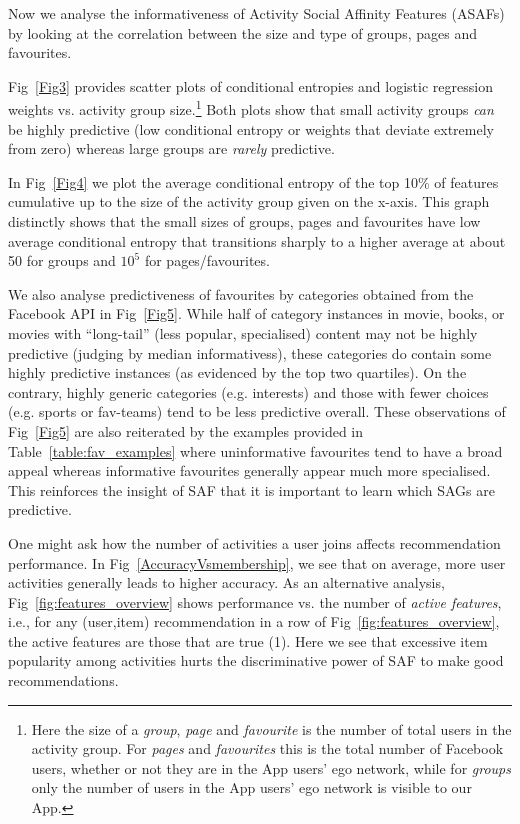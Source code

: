 
Now we analyse the informativeness of Activity Social Affinity
Features (ASAFs) by looking at the correlation between the size and
type of groups, pages and favourites.

Fig~\ref{Fig3} provides scatter plots of conditional
entropies and logistic regression weights vs. activity group 
size.\footnote{Here the size of a {\em group}, {\em page} and {\em favourite}
is the number of total users in the activity group.  For {\em pages}
and {\em favourites} this is the total number of Facebook users,
whether or not they are in the App users' ego network, while for {\em
groups} only the number of users in the App users' ego network is
visible to our App.}  Both plots show that small activity groups
\emph{can} be highly predictive (low conditional entropy or
weights that deviate extremely from zero) whereas large groups are
\emph{rarely} predictive.

In Fig~\ref{Fig4} we plot the average conditional entropy of the top
10\% of features cumulative up to the size of the activity group given
on the x-axis.
This graph distinctly shows that the
small sizes of groups, pages and favourites have low average
conditional entropy that transitions sharply to a higher average 
at about 50 for groups and $10^{5}$ for pages/favourites.

We also analyse predictiveness of favourites by categories obtained
from the Facebook API in Fig~\ref{Fig5}.  While half of category
instances in movie, books, or movies with ``long-tail'' (less popular,
specialised) content may not be highly predictive (judging by median
informativess), these categories do contain some highly predictive
instances (as evidenced by the top two quartiles).  On the contrary,
highly generic categories (e.g. interests) and those with fewer
choices (e.g. sports or fav-teams) tend to be less predictive overall.
These observations of Fig~\ref{Fig5} are also reiterated by the
examples provided in Table~\ref{table:fav_examples} where
uninformative favourites tend to have a broad appeal whereas
informative favourites generally appear much more specialised.  This
reinforces the insight of SAF that it is important to learn
which SAGs are predictive.
   
One might ask how the number of activities a user joins affects
recommendation performance.  In Fig~\ref{AccuracyVsmembership}, we see
that on average, more user activities generally leads to higher
accuracy.  As an alternative analysis, Fig~\ref{fig:features_overview}
shows performance vs.  the number of \emph{active features}, i.e., for
any (user,item) recommendation in a row of
Fig~\ref{fig:features_overview}, the active features are those that
are true (1).  Here we see that excessive item popularity among
activities hurts the discriminative power of SAF to make good
recommendations.

